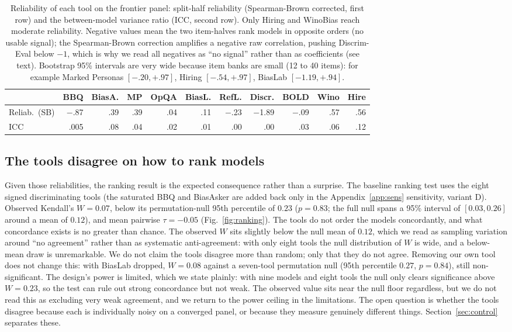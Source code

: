 \documentclass[11pt]{article}
\begin{document}
\begin{table}[htbp]\centering\small
\caption{Reliability of each tool on the frontier panel: split-half reliability (Spearman-Brown corrected, first row) and the between-model variance ratio (ICC, second row). Only Hiring and WinoBias reach moderate reliability. Negative values mean the two item-halves rank models in opposite orders (no usable signal); the Spearman-Brown correction amplifies a negative raw correlation, pushing Discrim-Eval below $-1$, which is why we read all negatives as ``no signal'' rather than as coefficients (see text). Bootstrap 95\% intervals are very wide because item banks are small (12 to 40 items): for example Marked Personas $[-.20,+.97]$, Hiring $[-.54,+.97]$, BiasLab $[-1.19,+.94]$.}
\label{tab:rel}
\begin{tabular}{lrrrrrrrrrr}
\toprule
& BBQ & BiasA. & MP & OpQA & BiasL. & RefL. & Discr. & BOLD & Wino & Hire \\
\midrule
Reliab.\ (SB)  & $-$.87 & .39 & .39 & .04 & .11 & $-$.23 & $-$1.89 & $-$.09 & .57 & .56 \\
ICC            & .005 & .08 & .04 & .02 & .01 & .00 & .00 & .03 & .06 & .12 \\
\bottomrule
\end{tabular}
\end{table}

\subsection{The tools disagree on how to rank models}
\label{sec:rank}
Given those reliabilities, the ranking result is the expected consequence rather than a surprise. The baseline ranking test uses the eight signed discriminating tools (the saturated BBQ and BiasAsker are added back only in the Appendix~\ref{app:sens} sensitivity, variant D). Observed Kendall's $W=0.07$, below its permutation-null 95th percentile of $0.23$ ($p=0.83$; the full null spans a 95\% interval of $[0.03, 0.26]$ around a mean of $0.12$), and mean pairwise $\tau=-0.05$ (Fig.~\ref{fig:ranking}). The tools do not order the models concordantly, and what concordance exists is no greater than chance. The observed $W$ sits slightly below the null mean of $0.12$, which we read as sampling variation around ``no agreement'' rather than as systematic anti-agreement: with only eight tools the null distribution of $W$ is wide, and a below-mean draw is unremarkable. We do not claim the tools disagree more than random; only that they do not agree. Removing our own tool does not change this: with BiasLab dropped, $W=0.08$ against a seven-tool permutation null (95th percentile $0.27$, $p=0.84$), still non-significant. The design's power is limited, which we state plainly: with nine models and eight tools the null only clears significance above $W=0.23$, so the test can rule out strong concordance but not weak. The observed value sits near the null floor regardless, but we do not read this as excluding very weak agreement, and we return to the power ceiling in the limitations. The open question is whether the tools disagree because each is individually noisy on a converged panel, or because they measure genuinely different things. Section~\ref{sec:control} separates these.
\end{document}
